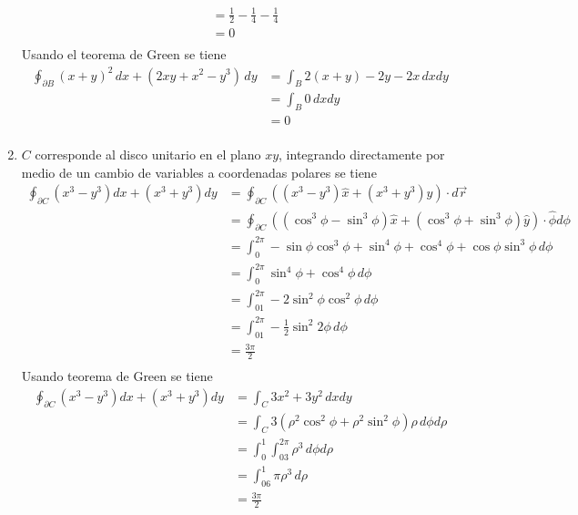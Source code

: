 \begin{enumerate}[label=\alph*)]
\begin{equation}
\begin{split}
        &= \frac{1}{2}-\frac{1}{4}-\frac{1}{4}\\
        &=0\\
    \end{split}
    \nonumber
    \end{equation}
    Usando el teorema de Green se tiene
    \begin{equation}
    \begin{split}
        \oint_{\partial B} (x+y)^2\,dx + (2xy+x^2-y^3)\,dy &=
        \int_B 2(x+y)-2y-2x\,dxdy\\
        &= \int_B 0\,dxdy\\
        &= 0\\
    \end{split}
    \nonumber
    \end{equation}
    \item $C$ corresponde al disco unitario en el plano $xy$, integrando directamente por medio de un cambio de variables a coordenadas polares se tiene
    \begin{equation}
    \begin{split}
        \oint_{\partial C}(x^3-y^3)dx+(x^3+y^3)dy&=
        \oint_{\partial C}((x^3-y^3)\hat{x}+(x^3+y^3)\hat{y})
        \cdot d\Vec{r}\\
        &=\oint_{\partial C}((\cos^3{\phi}-\sin^3{\phi})\hat{x}
        +(\cos^3{\phi}+\sin^3{\phi})\hat{y})
        \cdot \hat{\phi}d\phi\\
        &=\int^{2\pi}_0-\sin{\phi}\cos^3{\phi}+\sin^4{\phi}
        +\cos^4{\phi}+\cos{\phi}\sin^3{\phi}\,d\phi\\
        &=\int^{2\pi}_0\sin^4{\phi}+\cos^4{\phi}\,d\phi\\
        &=\int^{2\pi}_01-2\sin^2{\phi}\cos^2{\phi}\,d\phi\\
        &=\int^{2\pi}_01-\frac{1}{2}\sin^2{2\phi}\,d\phi\\
        &=\frac{3\pi}{2}\\
    \end{split}
    \nonumber
    \end{equation}
    Usando teorema de Green se tiene
    \begin{equation}
    \begin{split}
        \oint_{\partial C}(x^3-y^3)dx+(x^3+y^3)dy&=
        \int_C 3x^2+3y^2\,dxdy\\
        &=\int_C3(\rho^2\cos^2{\phi}+\rho^2\sin^2{\phi})\rho\,d\phi d\rho\\
        &=\int^1_0\int^{2\pi}_03\rho^3\,d\phi d\rho\\
        &=\int^1_06\pi\rho^3\,d\rho\\
        &=\frac{3\pi}{2}\\
    \end{split}
    \nonumber
    \end{equation}
\end{enumerate}
\newpage
{}\\
\bigbreak

